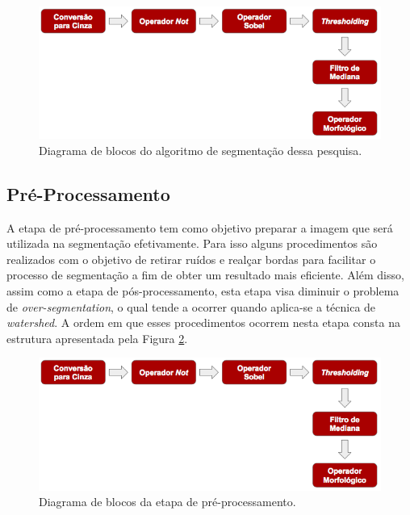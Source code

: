 	\begin{figure}[!htb]
       \begin{center}  
          \includegraphics[width=0.7\columnwidth]{img/diagrama_blocos_preprocessamento.jpg}
           \caption{\label{fig:diagrama_blocos_algoritmo}Diagrama de blocos do algoritmo de segmentação dessa pesquisa.}
       \end{center}
   \end{figure} 

\subsection{Pré-Processamento}
A etapa de pré-processamento tem como objetivo preparar a imagem que será utilizada na segmentação efetivamente. Para isso alguns procedimentos são realizados com o objetivo de retirar ruídos e realçar bordas para facilitar o processo de segmentação a fim de obter um resultado mais eficiente. Além disso, assim como a etapa de pós-processamento, esta etapa visa diminuir o problema de \textit{over-segmentation}, o qual tende a ocorrer quando aplica-se a técnica de \textit{watershed}.
A ordem em que esses procedimentos ocorrem nesta etapa consta na estrutura apresentada pela Figura \ref{fig:diagrama_blocos_preprocessamento}.

	\begin{figure}[!htb]
       \begin{center}  
          \includegraphics[width=0.8\columnwidth]{img/diagrama_blocos_preprocessamento.jpg}
           \caption{\label{fig:diagrama_blocos_preprocessamento}Diagrama de blocos da etapa de pré-processamento.}
       \end{center}
   \end{figure}

